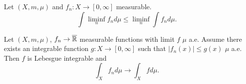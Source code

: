 \documentclass{article}
\begin{document}
\begin{thm}
    Let $(X,m,\mu)$ and $f_n : X\to [0,\infty ]$ measurable.
    \[
        \int \liminf_n f_n d\mu \leq \liminf_n \int f_n  d\mu . 
    \]
\end{thm}

\begin{thm}
    Let $(X,m,\mu)$, $f_n \to \overline{\mathbb{R}} $ measurable functions with limit $f$ $\mu$ a.e. Assume there exists an integrable function $g : X \to [0,\infty]$ such that $| f_n (x) |\leq g(x) $ $\mu $ a.e. Then $f$ is Lebesgue integrable and 
    \[
        \int _X f_n d\mu \to \int _X f d\mu. 
    \]
\end{thm}
\end{document}
